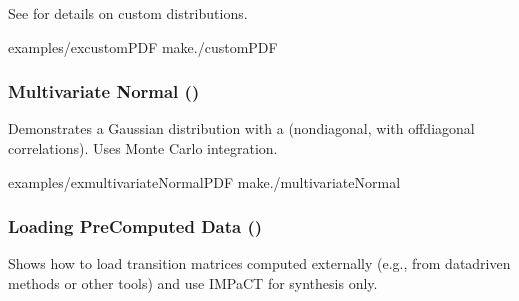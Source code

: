 \documentclass[a4paper,10pt,english]{sphinxmanual}
\begin{document}
\sphinxAtStartPar
See {\hyperref[\detokenize{user-guide/configuration::doc}]{}} for details on custom distributions.

\sphinxAtStartPar
{}

\begin{sphinxVerbatim}[commandchars=\\\{\}]
examples/ex\PYGZus{}customPDF
make./customPDF
\end{sphinxVerbatim}


\subsubsection{Multivariate Normal ()}
\label{\detokenize{examples/advanced:multivariate-normal-ex-multivariatenormalpdf}}
\sphinxAtStartPar
Demonstrates a Gaussian distribution with a 
(non\sphinxhyphen{}diagonal, with off\sphinxhyphen{}diagonal correlations). Uses Monte Carlo integration.

\sphinxAtStartPar
{}

\begin{sphinxVerbatim}[commandchars=\\\{\}]
\end{sphinxVerbatim}

\sphinxAtStartPar
{}

\begin{sphinxVerbatim}[commandchars=\\\{\}]
examples/ex\PYGZus{}multivariateNormalPDF
make./multivariateNormal
\end{sphinxVerbatim}


\subsubsection{Loading Pre\sphinxhyphen{}Computed Data ()}
\label{\detokenize{examples/advanced:loading-pre-computed-data-ex-load-reach}}
\sphinxAtStartPar
Shows how to load transition matrices computed externally (e.g., from data\sphinxhyphen{}driven
methods or other tools) and use IMPaCT for synthesis only.
\end{document}
